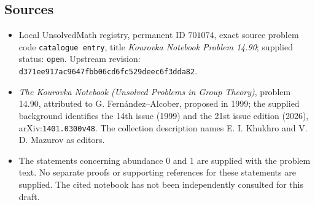 \documentclass[11pt]{article}
\begin{document}
\subsection{Sources}
\begin{itemize}
\item Local UnsolvedMath registry, permanent ID \(701074\), exact source problem code \texttt{catalogue entry}, title \emph{Kourovka Notebook Problem 14.90}; supplied status: \texttt{open}. Upstream revision: \texttt{d371ee917ac9647fbb06cd6fc529deec6f3dda82}.
\item \emph{The Kourovka Notebook (Unsolved Problems in Group Theory)}, problem 14.90, attributed to G. Fern\'andez--Alcober, proposed in 1999; the supplied background identifies the 14th issue (1999) and the 21st issue edition (2026), arXiv:\texttt{1401.0300v48}. The collection description names E. I. Khukhro and V. D. Mazurov as editors.
\item The statements concerning abundance \(0\) and \(1\) are supplied with the problem text. No separate proofs or supporting references for these statements are supplied. The cited notebook has not been independently consulted for this draft.
\end{itemize}
\end{document}
